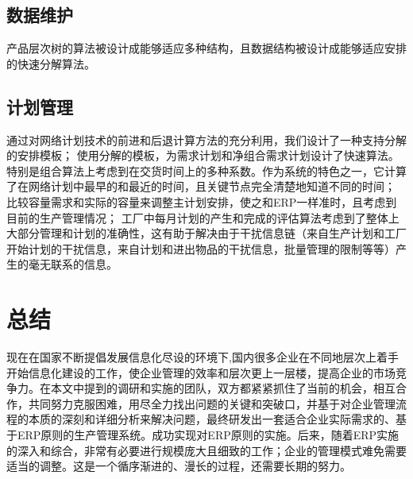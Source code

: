 \subsection{数据维护}

产品层次树的算法被设计成能够适应多种结构，且数据结构被设计成能够适应安排的快速分解算法。

\subsection{计划管理}

通过对网络计划技术的前进和后退计算方法的充分利用，我们设计了一种支持分解的安排模板；
使用分解的模板，为需求计划和净组合需求计划设计了快速算法。特别是组合算法上考虑到在交货时间上的多种系数。作为系统的特色之一，它计算了在网络计划中最早的和最近的时间，且关键节点完全清楚地知道不同的时间；
比较容量需求和实际的容量来调整主计划安排，使之和ERP一样准时，且考虑到目前的生产管理情况；
工厂中每月计划的产生和完成的评估算法考虑到了整体上大部分管理和计划的准确性，这有助于解决由于干扰信息链（来自生产计划和工厂开始计划的干扰信息，来自计划和进出物品的干扰信息，批量管理的限制等等）产生的毫无联系的信息。

\section{总结}

现在在国家不断提倡发展信息化尽设的环境下,国内很多企业在不同地层次上着手开始信息化建设的工作，使企业管理的效率和层次更上一层楼，提高企业的市场竞争力。在本文中提到的调研和实施的团队，双方都紧紧抓住了当前的机会，相互合作，共同努力克服困难，用尽全力找出问题的关键和突破口，并基于对企业管理流程的本质的深刻和详细分析来解决问题，最终研发出一套适合企业实际需求的、基于ERP原则的生产管理系统。成功实现对ERP原则的实施。后来，随着ERP实施的深入和综合，非常有必要进行规模庞大且细致的工作；企业的管理模式难免需要适当的调整。这是一个循序渐进的、漫长的过程，还需要长期的努力。


